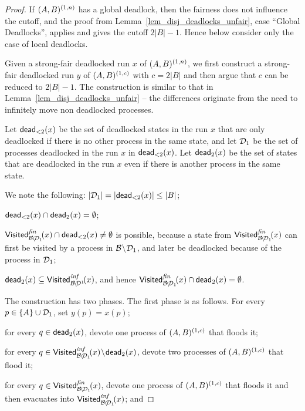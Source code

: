 \begin{proof}

\providecommand{\deadOne}[1]{\dead_{<2}(#1)}
\providecommand{\deadTwo}[1]{\dead_2(#1)}

If $(A,B)^{(1,n)}$ has a global deadlock, 
then the fairness does not influence the cutoff, 
and the proof from Lemma~\ref{lem_disj_deadlocks_unfair}, 
case ``Global Deadlocks'', applies and gives the cutoff $2|B|-1$. 
Hence below consider only the case of local deadlocks. 

Given a strong-fair deadlocked run $x$ of $(A,B)^{(1,n)}$, 
we first construct a strong-fair deadlocked run $y$ of $(A,B)^{(1,c)}$ 
with $c=2|B|$ and then argue that $c$ can be reduced to $2|B|-1$. 
The construction is similar to that in Lemma~\ref{lem_disj_deadlocks_unfair} 
-- the differences originate from the need to infinitely move 
non deadlocked processes.

Let $\deadOne{x}$ be the set of deadlocked states in the run $x$ 
that are only deadlocked if there is no other process in the same state, 
and let $\mathcal{D}_1$ be the set of processes deadlocked 
in the run $x$ in $\deadOne{x}$. 
Let $\deadTwo{x}$ be the set of states that are deadlocked 
in the run $x$ even if there is another process in the same state. 

We note the following:
\li
\- $|\mD_1| = |\deadOne{x}| \leq |B|$;

\- $\deadOne{x} \cap \deadTwo{x} = \emptyset$;

\- $\visFin{\mB\smi \mD_1}{x} \cap \deadOne{x} \neq \emptyset$
   is possible, because a state from $\mathsf{Visited}^{\textit{fin}}_{\mathcal{B}\!\setminus\! \mathcal{D}_1}\!(x)$ 
   can first be visited by a process in $\mathcal{B} \!\setminus\! \mathcal{D}_1$, 
   and later be deadlocked because of the process in $\mathcal{D}_1$;

\- $\deadTwo{x} \subseteq \visInf{\mB\smi \mD^1}{x}$,
   and hence $\visFin{\mB \smi \mD_1}{x} \cap \deadTwo{x} = \emptyset$.
\il

The construction has two phases. 
The first phase is as follows.
\li
\-[a.] For every $p \in \{A\} \cup \mathcal{D}_1$, set $y(p)=x(p)$;

\-[b.] for every $q \in \deadTwo{x}$, 
       devote one process of $(A,B)^{(1,c)}$ that floods it;

\-[c.] for every $q \in \visInf{\mB \smi \mD_1}{x} \smi \deadTwo{x}$,
       devote two processes of $(A,B)^{(1,c)}$ that flood it;

\-[d.] for every $q \in \mathsf{Visited}^{\textit{fin}}_{\mathcal{B} \!\setminus\! \mathcal{D}_1}\!(x)$, 
       devote one process of $(A,B)^{(1,c)}$ that floods it
       and then evacuates into $\mathsf{Visited}^{\textit{inf}}_{\mathcal{B} \!\setminus\! \mathcal{D}_1}\!(x)$;
       and


\end{proof}
